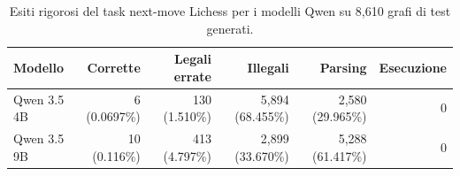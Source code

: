 \begin{table}[H]
    \centering
    \scriptsize
    \caption{Esiti rigorosi del task next-move Lichess per i modelli Qwen su 8,610 grafi di test generati.}
    \label{tab:llm-failure-breakdown}
    
    \begin{tabularx}{\textwidth}{>{\raggedright\arraybackslash}Xrrrrr}
        \toprule
        Modello & Corrette & Legali errate & Illegali & Parsing & Esecuzione \\
        \midrule
        Qwen 3.5 4B & 6 (0.0697\%) & 130 (1.510\%) & 5,894 (68.455\%) & 2,580 (29.965\%) & 0 \\
        Qwen 3.5 9B & 10 (0.116\%) & 413 (4.797\%) & 2,899 (33.670\%) & 5,288 (61.417\%) & 0 \\
        \bottomrule
    \end{tabularx}
\end{table}
